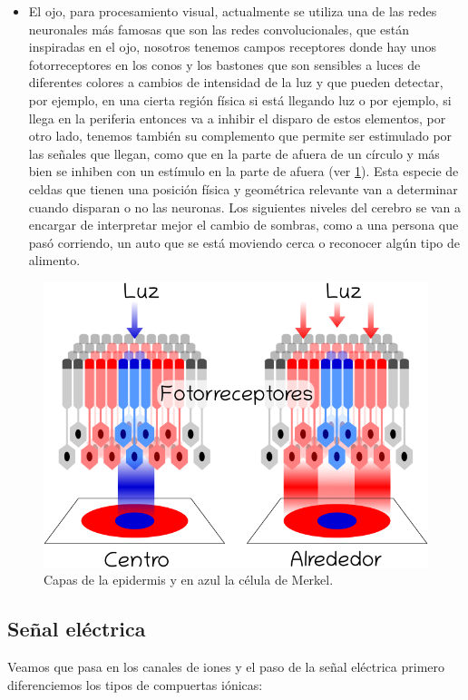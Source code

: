 \begin{itemize}
\item El ojo, para procesamiento visual, actualmente se utiliza una de las redes neuronales más famosas que son las redes convolucionales, que están inspiradas en el ojo, nosotros tenemos campos receptores donde hay unos fotorreceptores en los conos y los bastones que son sensibles a luces de diferentes colores a cambios de intensidad de la luz y que pueden detectar, por ejemplo, en una cierta región física si está llegando luz  o por ejemplo, si llega en la periferia entonces va a inhibir el disparo de estos elementos, por otro lado, tenemos también su complemento que permite ser estimulado por las señales que llegan, como que en la parte de afuera de un círculo y más bien se inhiben con un estímulo en la parte de afuera (ver \ref{fig:nSen}). Esta especie de celdas que tienen una posición física y geométrica relevante van a determinar cuando disparan o no las neuronas. Los siguientes niveles del cerebro se van a encargar de interpretar mejor  el cambio de sombras, como a una persona que pasó corriendo, un auto que se está moviendo cerca o reconocer algún tipo de alimento.
\end{itemize}


\begin{figure}[h]
 \centering
 \includegraphics[scale=0.5]{../Figuras/nSensitivas.png}
 \caption{Capas de la epidermis y en azul la célula de Merkel.}
 \label{fig:nSen}
\end{figure}




\subsection{Señal eléctrica}
Veamos que pasa en los canales de iones y el paso de la señal eléctrica primero diferenciemos los tipos de compuertas iónicas:


